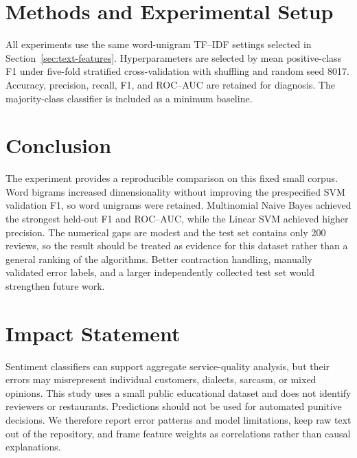 \documentclass{article}
\begin{document}



\section{Methods and Experimental Setup}
\label{sec:methods}

All experiments use the same word-unigram TF--IDF settings selected in
Section~\ref{sec:text-features}. Hyperparameters are selected by mean
positive-class F1 under five-fold stratified cross-validation with shuffling
and random seed 8017. Accuracy, precision, recall, F1, and ROC--AUC are retained
for diagnosis. The majority-class classifier is included as a minimum
baseline.




\section{Conclusion}

The experiment provides a reproducible comparison on this fixed small corpus.
Word bigrams increased dimensionality without improving the prespecified SVM
validation F1, so word unigrams were retained. Multinomial Naive Bayes achieved
the strongest held-out F1 and ROC--AUC, while the Linear SVM achieved higher
precision. The numerical gaps are modest and the test set contains only 200
reviews, so the result should be treated as evidence for this dataset rather
than a general ranking of the algorithms. Better contraction handling,
manually validated error labels, and a larger independently collected test set
would strengthen future work.

\section*{Impact Statement}

Sentiment classifiers can support aggregate service-quality analysis, but
their errors may misrepresent individual customers, dialects, sarcasm, or
mixed opinions. This study uses a small public educational dataset and does
not identify reviewers or restaurants. Predictions should not be used for
automated punitive decisions. We therefore report error patterns and model
limitations, keep raw text out of the repository, and frame feature weights as
correlations rather than causal explanations.



\end{document}
